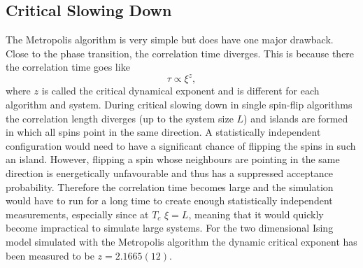 \documentclass[11pt, a4paper]{report} %
\begin{document}
\subsection{Critical Slowing Down}\label{sec:critical_slowing_down}
The Metropolis algorithm is very simple but does have one major drawback.
Close to the phase transition, the correlation time diverges.
This is because there the correlation time goes like
\begin{equation}
	\tau \propto \xi^z,
\end{equation}
where \(z\) is called the critical dynamical exponent and is different for each algorithm and system.
During critical slowing down in single spin-flip algorithms the correlation length diverges (up to the system size \(L\)) and islands are formed in which all spins point in the same direction.
A statistically independent configuration would need to have a significant chance of flipping the spins in such an island.
However, flipping a spin whose neighbours are pointing in the same direction is energetically unfavourable and thus has a suppressed acceptance probability.
Therefore the correlation time becomes large and the simulation would have to run for a long time to create enough statistically independent measurements,\cite{binney:1992} especially since at \(T_c\) \(\xi = L\), meaning that it would quickly become impractical to simulate large systems.
For the two dimensional Ising model simulated with the  Metropolis algorithm the dynamic critical exponent has been measured to be \(z=2.1665(12)\).\cite{nightingale:1996}
\end{document}

